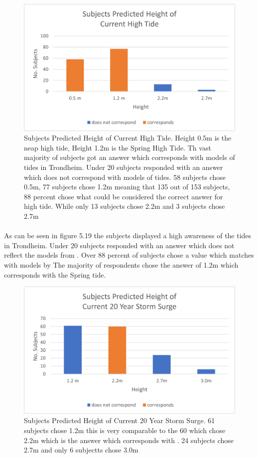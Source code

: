 \begin{figure}[h!]
    \centering
    \includegraphics{fig_results/2022-hightide-answers.png}
    \caption{Subjects Predicted Height of Current High Tide. Height 0.5m is the neap high tide, Height 1.2m is the Spring High Tide. Th vast majority of subjects got an answer which corresponds with models of tides in Trondheim. Under 20 subjects responded with an answer which does not correspond with models of tides. 58 subjects chose 0.5m, 77 subjects chose 1.2m meaning that 135 out of 153 subjects, 88 percent chose what could be considered the correct answer for high tide. While only 13 subjects chose 2.2m and 3 subjects chose 2.7m}
    \label{fig:high-tide-answer}
\end{figure}
\paragraph{}
As can be seen in figure 5.19 the subjects displayed a high awareness of the tides in Trondheim. Under 20 subjects responded with an answer which does not reflect the models from \cite{kartverket_se_2021}. Over 88 percent of subjects chose a value which matches with models by \cite{kartverket_se_2021} The majority of respondents chose the answer of 1.2m which corresponds with the Spring tide. 

\begin{figure}[h!]
    \centering
    \includegraphics{fig_results/2022-20yrss-answer.png}
    \caption{Subjects Predicted Height of Current 20 Year Storm Surge. 61 subjects chose 1.2m this is very comparable to the 60 which chose 2.2m which is the answer which corresponds with \cite{kartverket_se_2021}. 24 subjects chose 2.7m and only 6 subjectts chose 3.0m}
    \label{fig:2022-stormsurge-answers}
\end{figure}
